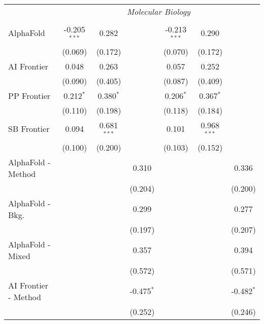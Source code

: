 \begin{tabular}{lcccccc}
 & \multicolumn{6}{c}{\textit{Molecular Biology}} \\ \\
   AlphaFold            & -0.205$^{***}$ & 0.282         &               & -0.213$^{***}$ & 0.290         &   \\   
                        & (0.069)        & (0.172)       &               & (0.070)        & (0.172)       &   \\   
   AI Frontier          & 0.048          & 0.263         &               & 0.057          & 0.252         &   \\   
                        & (0.090)        & (0.405)       &               & (0.087)        & (0.409)       &   \\   
   PP Frontier          & 0.212$^{*}$    & 0.380$^{*}$   &               & 0.206$^{*}$    & 0.367$^{*}$   &   \\   
                        & (0.110)        & (0.198)       &               & (0.118)        & (0.184)       &   \\   
   SB Frontier          & 0.094          & 0.681$^{***}$ &               & 0.101          & 0.968$^{***}$ &   \\   
                        & (0.100)        & (0.200)       &               & (0.103)        & (0.152)       &   \\   
   AlphaFold - Method   &                &               & 0.310         &                &               & 0.336\\   
                        &                &               & (0.204)       &                &               & (0.200)\\   
   AlphaFold - Bkg.     &                &               & 0.299         &                &               & 0.277\\   
                        &                &               & (0.197)       &                &               & (0.207)\\   
   AlphaFold - Mixed    &                &               & 0.357         &                &               & 0.394\\   
                        &                &               & (0.572)       &                &               & (0.571)\\   
   AI Frontier - Method &                &               & -0.475$^{*}$  &                &               & -0.482$^{*}$\\   
                        &                &               & (0.252)       &                &               & (0.246)\\   

\end{tabular}
